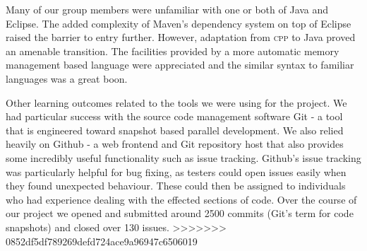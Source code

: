 Many of our group members were unfamiliar with one or both of Java and Eclipse. The added complexity of Maven's dependency system on top of Eclipse raised the barrier to entry further. However, adaptation from \textsc{cpp} to Java proved an amenable transition. The facilities provided by a more automatic memory management based language were appreciated and the similar syntax to familiar languages was a great boon.

Other learning outcomes related to the tools we were using for the project. We had particular success with the source code management software Git - a tool that is engineered toward snapshot based parallel development. We also relied heavily on Github - a web frontend and Git repository host that also provides some incredibly useful functionality such as issue tracking. Github's issue tracking was particularly helpful for bug fixing, as testers could open issues easily when they found unexpected behaviour. These could then be assigned to individuals who had experience dealing with the effected sections of code. Over the course of our project we opened and submitted around 2500 commits (Git's term for code snapshots) and closed over 130 issues.
>>>>>>> 0852df5df789269defd724ace9a96947c6506019
